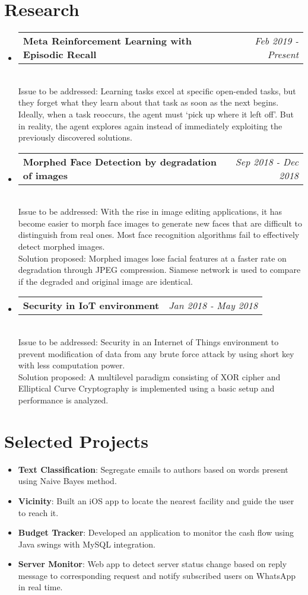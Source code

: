 \documentclass[letterpaper,12pt]{article}
\makeatletter
\newcommand{\resumeItem}[2]{
  \item\small{
    \textbf{#1}{: #2 \vspace{-2pt}}
  }
}
\newcommand{\resumeResearchSubheading}[2]{
  \vspace{-1pt}\item
    \begin{tabular*}{0.97\textwidth}[t]{l@{\extracolsep{\fill}}r}
         \textbf{\small #1} & \textit{\small #2} \\
    \end{tabular*}\vspace{3pt}
}
\newcommand{\resumeSubItem}[2]{\resumeItem{#1}{#2}\vspace{-4pt}}
\newcommand{\resumeSubHeadingListStart}{\begin{itemize}[leftmargin=*]}
\newcommand{\resumeSubHeadingListEnd}{\end{itemize}}
\makeatother
\begin{document}
\section{Research}
  \resumeSubHeadingListStart
    \resumeResearchSubheading{Meta Reinforcement Learning with Episodic Recall}{Feb 2019 - Present}\\
        \small{
        {Issue to be addressed: Learning tasks excel at specific open-ended tasks, but they forget what they learn about that task as soon as the next begins. Ideally, when a task reoccurs, the agent must ‘pick up where it left off’. But in reality, the agent explores again instead of immediately exploiting the previously discovered solutions. \vspace{-2pt}}
         }
    \resumeResearchSubheading{Morphed Face Detection by degradation of images}{Sep 2018 - Dec 2018}\\
        \small{
        {Issue to be addressed: With the rise in image editing applications, it has become easier to morph face images to generate new faces that are difficult to distinguish from real ones. Most face recognition algorithms fail to effectively detect morphed images.\vspace{-2pt}}
         }
         \\[3pt]
        \small{
        {Solution proposed: Morphed images lose facial features at a faster rate on degradation through JPEG compression. Siamese network is used to compare if the degraded and original image are identical. \vspace{-2pt}}
         }\\
    \resumeResearchSubheading{Security in IoT environment}{Jan 2018 - May 2018}\\
        \small{
        {Issue to be addressed: Security in an Internet of Things environment to prevent modification of data from any brute force attack by using short key with less computation power.\vspace{-2pt}}
         }
         \\[3pt]
        \small{
        {Solution proposed: A multilevel paradigm consisting of XOR cipher and Elliptical Curve Cryptography is implemented using a basic setup and performance is analyzed. \vspace{-2pt}}
         }\\
  \resumeSubHeadingListEnd


\section{Selected Projects}
  \resumeSubHeadingListStart
    \resumeSubItem{Text Classification}
      {Segregate emails to authors based on words present using Naive Bayes method.}
    \resumeSubItem{Vicinity}
      {Built an iOS app to locate the nearest facility and guide the user to reach it.}
    \resumeSubItem{Budget Tracker}
      {Developed an application to monitor the cash flow using Java swings with MySQL integration.}
   \resumeSubItem{Server Monitor}
      {Web app to detect server status change based on reply message to corresponding request and notify subscribed users on WhatsApp in real time.}
  \resumeSubHeadingListEnd
\end{document}
